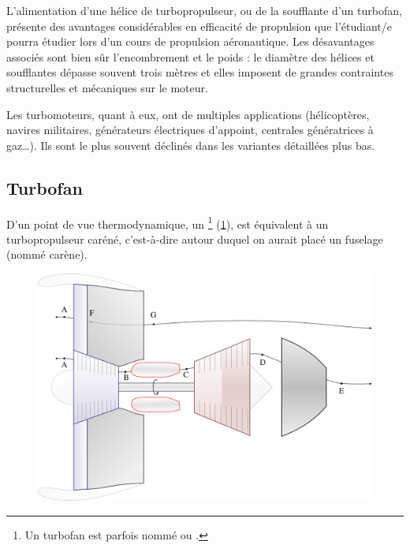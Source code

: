		L’alimentation d’une hélice de turbopropulseur, ou de la soufflante d’un turbofan, présente des avantages considérables en efficacité de propulsion que l’étudiant/e pourra étudier lors d’un cours de propulsion aéronautique. Les désavantages associés sont bien sûr l’encombrement et le poids : le diamètre des hélices et soufflantes dépasse souvent trois mètres et elles imposent de grandes contraintes structurelles et mécaniques sur le moteur.

		Les turbomoteurs, quant à eux, ont de multiples applications (hélicoptères, navires militaires, générateurs électriques d’appoint, centrales génératrices à gaz…). Ils sont le plus souvent déclinés dans les variantes détaillées plus bas.
		

	\dontbreakpage

	\subsection{Turbofan}

		D’un point de vue thermodynamique, un \footnote{Un turbofan est parfois nommé  ou .} (\cref{fig_turbofan}), est équivalent à un turbopropulseur caréné, c’est-à-dire autour duquel on aurait placé un fuselage (nommé carène).
		
		\begin{figure}
			\begin{center}
				\includegraphics[scale=0.6]{images/circuit_turbofan.png}
			\end{center}
			\label{fig_turbofan}
		\end{figure}
		

